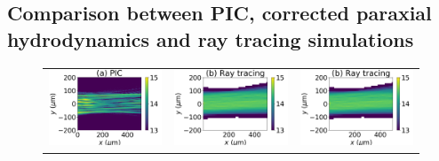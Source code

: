 \documentclass[%
 reprint,
 amsmath,amssymb,
 aps,
]{revtex4-1}
\begin{document}
\subsection{Comparison between PIC,  corrected paraxial hydrodynamics and ray tracing simulations}
\begin{figure}
\begin{tabular}{ccc}
\includegraphics[scale=0.39]{Figure/I_Smilei24ps_te500eV_C6p.png}
&\includegraphics[scale=0.39]{Figure/I_HERA24ps_te500eV_C6p.png}
&\includegraphics[scale=0.39]{Figure/I_HERA24ps_te500eV_C6p.png}\\

\end{tabular}
\end{figure}
\end{document}
